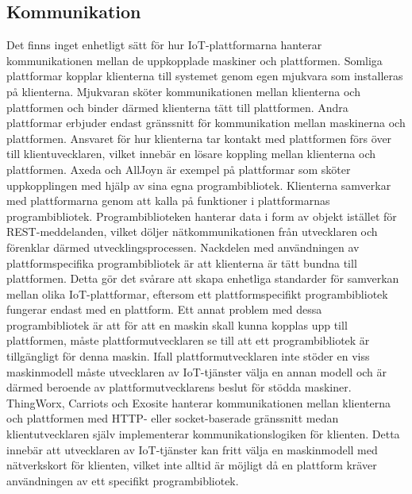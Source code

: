 \subsection{Kommunikation}
Det finns inget enhetligt sätt för hur IoT-plattformarna hanterar 
kommunikationen mellan de uppkopplade maskiner och plattformen. 
Somliga plattformar kopplar klienterna till systemet genom egen mjukvara som
installeras på klienterna. Mjukvaran sköter kommunikationen mellan klienterna
och plattformen och binder därmed klienterna tätt till plattformen. Andra 
plattformar erbjuder endast gränssnitt för kommunikation mellan maskinerna och 
plattformen. Ansvaret för hur klienterna tar kontakt med plattformen förs över
till klientuvecklaren, vilket innebär en lösare koppling mellan klienterna
och plattformen.
\newline
\newline
Axeda och AllJoyn är exempel på plattformar som sköter uppkopplingen med hjälp
av sina egna programbibliotek. Klienterna samverkar med plattformarna
genom att kalla på funktioner i plattformarnas programbibliotek. 
Programbiblioteken hanterar data i form av objekt istället för REST-meddelanden,
vilket döljer nätkommunikationen från utvecklaren och förenklar därmed
utvecklingsprocessen. Nackdelen med användningen av plattformspecifika
programbibliotek är att klienterna är tätt bundna till plattformen.
Detta gör det svårare att skapa enhetliga standarder för samverkan mellan
olika IoT-plattformar, eftersom ett plattformspecifikt programbibliotek fungerar
endast med en plattform. Ett annat problem med dessa programbibliotek är att
för att en maskin skall kunna kopplas upp till plattformen, måste
plattformutvecklaren se till att ett programbibliotek är tillgängligt för
denna maskin. Ifall plattformutvecklaren inte stöder en viss maskinmodell måste
utvecklaren av IoT-tjänster välja en annan modell och är därmed beroende av
plattformutvecklarens beslut för stödda maskiner.
\newline
\newline
ThingWorx, Carriots och Exosite hanterar kommunikationen mellan klienterna
och plattformen med HTTP- eller socket-baserade gränssnitt medan 
klientutvecklaren själv implementerar kommunikationslogiken för klienten.
Detta innebär att utvecklaren av IoT-tjänster kan fritt välja en maskinmodell
med nätverkskort för klienten, vilket inte alltid är möjligt då en plattform 
kräver användningen av ett specifikt programbibliotek.
\pagebreak

